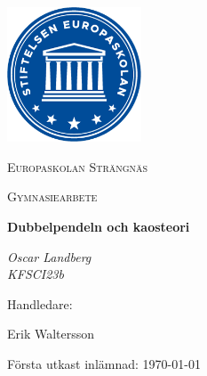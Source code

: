 \documentclass[a4paper, 12pt]{report}
\begin{document}
\begin{titlepage}
	\centering
	\includegraphics[width=0.3\textwidth]{europaskolan.png}\par\vspace{1cm}
	{\LARGE \textsc{Europaskolan Strängnäs}\par}
	\vspace{1cm}
	{\Large \textsc{Gymnasiearbete}\par}
	\vspace{1.5cm}
	{\huge\bfseries Dubbelpendeln och kaosteori \par}
	\vspace{2cm}
	{\Large\itshape Oscar Landberg \\
		KFSCI23b\par}
	\vfill
	Handledare:\par
    \vspace{-1.5mm}
	Erik Waltersson

	\vfill

	{\large Första utkast inlämnad: \today}
\end{titlepage}


\tableofcontents


\printbibliography[title=Litteraturförteckning]
\end{document}
